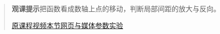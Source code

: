 \begin{quote}\small\textbf{观课提示}\quad 把函数看成数轴上点的移动，判断局部间距的放大与反向。

\href{https://www.youtube.com/watch?v=CfW845LNObM}{原课程视频}\quad\href{https://vitael04213.github.io/3blue1brown-notes/lessons/derivatives-and-transforms.html}{本节网页与媒体}\quad\href{https://vitael04213.github.io/3blue1brown-notes/lab.html\#derivative}{参数实验}
\end{quote}
